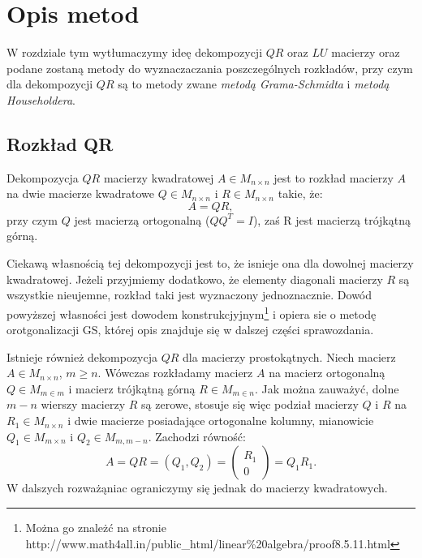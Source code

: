 \section{Opis metod}
W rozdziale tym wytłumaczymy ideę dekompozycji $QR$ oraz $LU$ macierzy oraz
podane zostaną metody do wyznaczaczania poszczególnych rozkładów, przy czym dla
dekompozycji $QR$ są to metody zwane \textit{metodą Grama-Schmidta} i
\textit{metodą Householdera}.
\subsection{Rozkład QR}
Dekompozycja $QR$ macierzy kwadratowej $A \in M_{n \times n}$ jest to rozkład
macierzy $A$ na dwie macierze kwadratowe $Q \in M_{n \times n}$ i $R \in M_{n
\times n}$ takie, że:
$$A=QR,$$
przy czym $Q$ jest macierzą ortogonalną ($QQ^T=I$), zaś R jest macierzą trójkątną
górną.

Ciekawą własnością tej dekompozycji jest to, że isnieje ona dla dowolnej
macierzy kwadratowej. Jeżeli przyjmiemy dodatkowo, że elementy diagonali
macierzy $R$ są wszystkie nieujemne, rozkład taki jest wyznaczony jednoznacznie.
Dowód powyższej własności jest dowodem konstrukcjyjnym\footnote{Można go znależć
na stronie http://www.math4all.in/public\_html/linear\%20algebra/proof8.5.11.html}
i opiera sie o metodę orotgonalizacji GS, której opis znajduje się w
dalszej części sprawozdania.

Istnieje również dekompozycja $QR$ dla macierzy prostokątnych. Niech macierz
$A \in M_{n \times n}$, $m \geq n$. Wówczas rozkładamy macierz $A$ na macierz
ortogonalną $Q \in M_{m \in m}$ i macierz trójkątną górną $R \in M_{m \in n}$.
Jak można zauważyć, dolne $m-n$ wierszy macierzy $R$ są zerowe, stosuje się więc
podział macierzy $Q$ i $R$ na $R_1 \in M_{n \times n}$ i dwie macierze posiadające
ortogonalne kolumny, mianowicie $Q_1 \in M_{m \times n}$ i $Q_2 \in M_{m, m-n}$.
Zachodzi równość:
$$A=QR=(Q_1, Q_2)=\begin{pmatrix} R_1 \\ 0 \end{pmatrix}=Q_1R_1.$$
W dalszych rozważąniac ograniczymy się jednak do macierzy kwadratowych.
